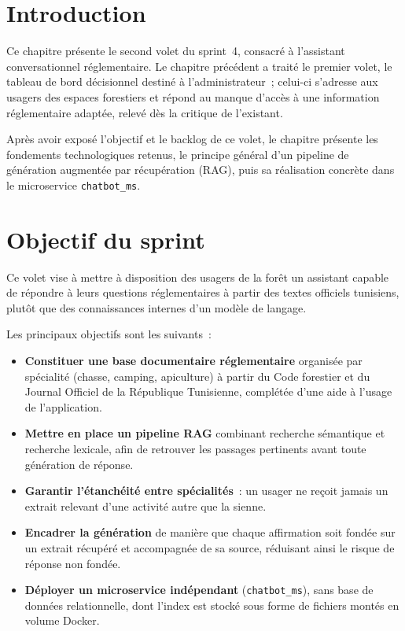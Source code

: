 
\section{Introduction}

Ce chapitre présente le second volet du sprint~4, consacré à l'assistant
conversationnel réglementaire. Le chapitre précédent a traité le premier volet,
le tableau de bord décisionnel destiné à l'administrateur~; celui-ci s'adresse
aux usagers des espaces forestiers et répond au manque d'accès à une information
réglementaire adaptée, relevé dès la critique de l'existant.

Après avoir exposé l'objectif et le backlog de ce volet, le chapitre présente les
fondements technologiques retenus, le principe général d'un pipeline de génération
augmentée par récupération (RAG), puis sa réalisation concrète dans le microservice
\texttt{chatbot\_ms}.

\section{Objectif du sprint}

Ce volet vise à mettre à disposition des usagers de la forêt un assistant capable
de répondre à leurs questions réglementaires à partir des textes officiels
tunisiens, plutôt que des connaissances internes d'un modèle de langage.

Les principaux objectifs sont les suivants~:

\begin{itemize}
  \item \textbf{Constituer une base documentaire réglementaire} organisée par
        spécialité (chasse, camping, apiculture) à partir du Code forestier et
        du Journal Officiel de la République Tunisienne, complétée d'une aide à
        l'usage de l'application.
  \item \textbf{Mettre en place un pipeline RAG} combinant recherche sémantique
        et recherche lexicale, afin de retrouver les passages pertinents avant
        toute génération de réponse.
  \item \textbf{Garantir l'étanchéité entre spécialités}~: un usager ne reçoit
        jamais un extrait relevant d'une activité autre que la sienne.
  \item \textbf{Encadrer la génération} de manière que chaque affirmation soit
        fondée sur un extrait récupéré et accompagnée de sa source, réduisant
        ainsi le risque de réponse non fondée.
  \item \textbf{Déployer un microservice indépendant} (\texttt{chatbot\_ms}),
        sans base de données relationnelle, dont l'index est stocké sous forme
        de fichiers montés en volume Docker.
\end{itemize}

